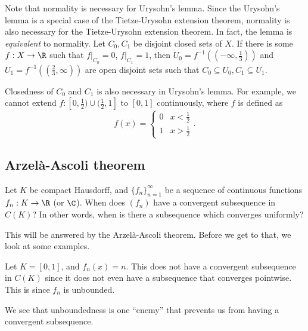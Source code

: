 \documentclass[a4paper]{article}
\begin{document}
Note that normality is necessary for Urysohn's lemma. Since the Urysohn's lemma is a special case of the Tietze-Urysohn extension theorem, normality is also necessary for the Tietze-Urysohn extension theorem. In fact, the lemma is \emph{equivalent} to normality. Let $C_0, C_1$ be disjoint closed sets of $X$. If there is some $f: X \to \R$ such that $f|_{C_0} = 0$, $f|_{C_1} = 1$, then $U_0 = f^{-1}\left(\left(-\infty, \frac{1}{3}\right)\right)$ and $U_1 = f^{-1}\left(\left(\frac{2}{3}, \infty\right)\right)$ are open disjoint sets such that $C_0 \subseteq U_0, C_1 \subseteq U_1$.

Closedness of $C_0$ and $C_1$ is also necessary in Urysohn's lemma. For example, we cannot extend $f: [0, \frac{1}{2}) \cup (\frac{1}{2}, 1]$ to $[0, 1]$ continuously, where $f$ is defined as
\[
  f(x) =
  \begin{cases}
    0 & x < \frac{1}{2}\\
    1 & x > \frac{1}{2}
  \end{cases}.
\]
\subsection{Arzel\texorpdfstring{\`a}{a}-Ascoli theorem}
Let $K$ be compact Hausdorff, and $\{f_n\}_{n = 1}^\infty$ be a sequence of continuous functions $f_n: K \to \R$ (or $\C$). When does $(f_n)$ have a convergent subsequence in $C(K)$? In other words, when is there a subsequence which converges uniformly?

This will be answered by the Arzel\`a-Ascoli theorem. Before we get to that, we look at some examples.
\begin{eg}
  Let $K = [0, 1]$, and $f_n(x) = n$. This does not have a convergent subsequence in $C(K)$ since it does not even have a subsequence that converges pointwise. This is since $f_n$ is unbounded.
\end{eg}
We see that unboundedness is one ``enemy'' that prevents us from having a convergent subsequence.
\end{document}
